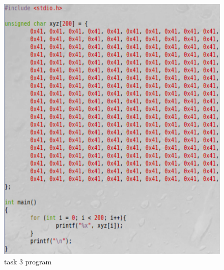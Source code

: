 \documentclass[12pt]{article}
\begin{document}
\begin{figure}[H]
	\begin{center}
		\includegraphics[scale=0.65]{pics/t3p1.png}
	\end{center}{}
	\caption{task 3 program}
	\label{fig:t3p1}
\end{figure}
\end{document}
